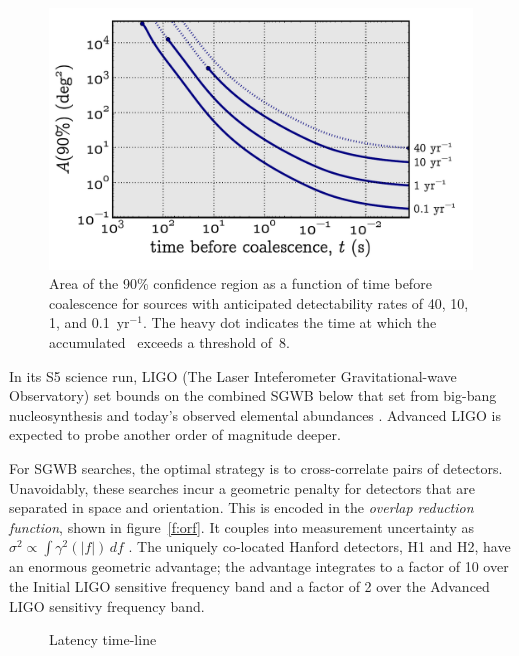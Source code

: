 \documentclass[portrait,plainboxedsections]{sciposter}
\begin{document}
\begin{multicols}{3}
\begin{figure}[h]
\end{figure}
%
\begin{figure}[h]
\includegraphics{figures/loc_in_time}
\caption{\label{fig:sky-localization-accuracy}Area of the 90\% confidence
region as a function of time before coalescence for sources with anticipated
detectability rates of 40, 10, 1, and 0.1~yr$^{-1}$. The heavy dot indicates
the time at which the accumulated \SNR\ exceeds a threshold of~8.}
\end{figure}

In its S5 science run, LIGO (The Laser Inteferometer Gravitational-wave
Observatory) set bounds on the combined SGWB below that set from
big-bang nucleosynthesis and today's observed elemental abundances
\cite{S5HLiso}. Advanced LIGO is expected to probe another order of
magnitude deeper.

For SGWB searches, the optimal strategy is to cross-correlate pairs of
detectors. Unavoidably, these searches incur a geometric penalty for
detectors that are separated in space and orientation. This is encoded in the
\emph{overlap reduction function}, shown in figure~\ref{f:orf}. It couples into
measurement uncertainty as $\sigma^2 \propto \int \gamma^2(|f|) \, df$
\cite{allenromano}. The uniquely co-located Hanford detectors, H1 and H2, have
an enormous geometric advantage; the advantage integrates to a factor of 10
over the Initial LIGO sensitive frequency band and a factor of 2 over the
Advanced LIGO sensitivy frequency band.

\begin{figure}
\caption{Latency time-line}
\label{f:latency_timeline}
\end{figure}


\end{multicols}
\end{document}
